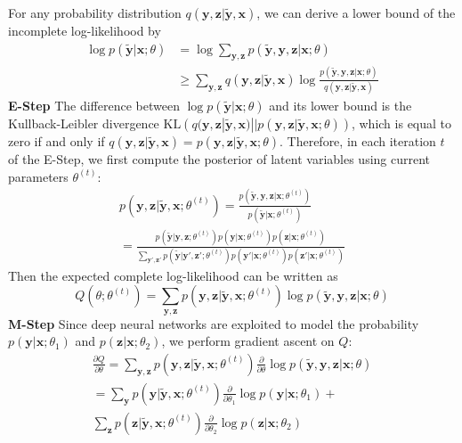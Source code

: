 \documentclass[10pt,twocolumn,letterpaper]{article}
\def\vec{\mathbf}
\begin{document}
For any probability distribution $q(\vec{y}, \vec{z} | \tilde{\vec{y}}, \vec{x})$, we can derive a lower bound of the incomplete log-likelihood by
\begin{equation}
\begin{aligned}
    \log p(\tilde{\vec{y}} | \vec{x}; \theta) &= \log \sum_{\vec{y},\vec{z}} p(\tilde{\vec{y}}, \vec{y}, \vec{z} | \vec{x}; \theta) \\
    &\geq \sum_{\vec{y},\vec{z}} q(\vec{y}, \vec{z} | \tilde{\vec{y}}, \vec{x}) \log \frac{p(\tilde{\vec{y}}, \vec{y}, \vec{z} | \vec{x}; \theta)}{q(\vec{y}, \vec{z} | \tilde{\vec{y}}, \vec{x})}
\end{aligned}
\end{equation}
\textbf{E-Step} The difference between $\log p(\tilde{\vec{y}} | \vec{x}; \theta)$ and its lower bound is the Kullback-Leibler divergence $\mathrm{KL}\left(q(\vec{y}, \vec{z} | \tilde{\vec{y}}, \vec{x}) || p(\vec{y}, \vec{z} | \tilde{\vec{y}}, \vec{x}; \theta)\right)$, which is equal to zero if and only if $q(\vec{y}, \vec{z} | \tilde{\vec{y}}, \vec{x}) = p(\vec{y}, \vec{z} | \tilde{\vec{y}}, \vec{x}; \theta)$. Therefore, in each iteration $t$ of the E-Step, we first compute the posterior of latent variables using current parameters $\theta^{(t)}$:
\begin{multline} \label{eq:posterior}
    p(\vec{y}, \vec{z} | \tilde{\vec{y}}, \vec{x}; \theta^{(t)}) = \frac{p(\tilde{\vec{y}}, \vec{y}, \vec{z} | \vec{x}; \theta^{(t)})}{p(\tilde{\vec{y}} | \vec{x}; \theta^{(t)})} \\
    = \frac{p(\tilde{\vec{y}}|\vec{y},\vec{z};\theta^{(t)}) p(\vec{y}|\vec{x};\theta^{(t)}) p(\vec{z}|\vec{x};\theta^{(t)})}{\sum_{\vec{y}',\vec{z}'} p(\tilde{\vec{y}}|\vec{y}',\vec{z}';\theta^{(t)}) p(\vec{y}'|\vec{x};\theta^{(t)}) p(\vec{z}'|\vec{x};\theta^{(t)})}
\end{multline}
Then the expected complete log-likelihood can be written as
\begin{equation}
    Q(\theta; \theta^{(t)}) = \sum_{\vec{y},\vec{z}} p(\vec{y}, \vec{z} | \tilde{\vec{y}}, \vec{x}; \theta^{(t)}) \log p(\tilde{\vec{y}}, \vec{y}, \vec{z} | \vec{x}; \theta)
\end{equation}
\textbf{M-Step} Since deep neural networks are exploited to model the probability $p(\vec{y}|\vec{x};\theta_1)$ and $p(\vec{z}|\vec{x};\theta_2)$, we perform gradient ascent on $Q$:
\begin{multline} \label{eq:gradient}
    \frac{\partial Q}{\partial \theta} = \sum_{\vec{y},\vec{z}} p(\vec{y}, \vec{z} | \tilde{\vec{y}}, \vec{x}; \theta^{(t)}) \frac{\partial}{\partial \theta} \log p(\tilde{\vec{y}}, \vec{y}, \vec{z} | \vec{x}; \theta) \\
    = \sum_{\vec{y}} p(\vec{y} | \tilde{\vec{y}}, \vec{x}; \theta^{(t)}) \frac{\partial}{\partial \theta_1} \log p(\vec{y}|\vec{x};\theta_1) + \\
      \sum_{\vec{z}} p(\vec{z} | \tilde{\vec{y}}, \vec{x}; \theta^{(t)}) \frac{\partial}{\partial \theta_2} \log p(\vec{z}|\vec{x};\theta_2)
\end{multline}
\end{document}
